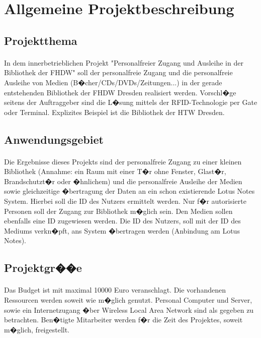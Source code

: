 \section{Allgemeine Projektbeschreibung}

\subsection{Projektthema}

\paragraph*{}
In dem innerbetrieblichen Projekt "Personalfreier Zugang und Ausleihe in der Bibliothek der FHDW" soll der personalfreie Zugang und die personalfreie Ausleihe von Medien (B�cher/CDs/DVDs/Zeitungen...) in der gerade entstehenden Bibliothek der FHDW Dresden realisiert werden. Vorschl�ge seitens der Auftraggeber sind die L�sung mittels der RFID-Technologie per Gate oder Terminal. Explizites Beispiel ist die Bibliothek der HTW Dresden.

\subsection{Anwendungsgebiet}

\paragraph*{}
Die Ergebnisse dieses Projekts sind der personalfreie Zugang zu einer kleinen Bibliothek (Annahme: ein Raum mit einer T�r ohne Fenster, Glast�r, Brandschutzt�r oder �hnlichem) und die personalfreie Ausleihe der Medien sowie gleichzeitige �bertragung der Daten an ein schon existierende Lotus Notes System.
Hierbei soll die ID des Nutzers ermittelt werden. Nur f�r autorisierte Personen soll der Zugang zur Bibliothek m�glich sein. Den Medien sollen ebenfalls eine ID zugewiesen werden. Die ID des Nutzers, soll mit der ID des Mediums verkn�pft, ans System �bertragen werden (Anbindung am Lotus Notes).

\subsection{Projektgr��e}

\paragraph*{}
Das Budget ist mit maximal 10000 Euro veranschlagt. Die vorhandenen Ressourcen werden soweit wie m�glich genutzt. Personal Computer und Server, sowie ein Internetzugang �ber Wireless Local Area Network sind als gegeben zu betrachten. Ben�tigte Mitarbeiter werden f�r die Zeit des Projektes, soweit m�glich, freigestellt.

